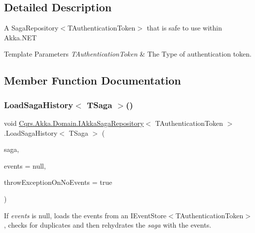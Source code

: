 \subsection{Detailed Description}
A Saga\+Repository$<$\+T\+Authentication\+Token$>$ that is safe to use within Akka.\+N\+ET 


\begin{DoxyTemplParams}{Template Parameters}
{\em T\+Authentication\+Token} & The Type of authentication token.\\
\hline
\end{DoxyTemplParams}


\subsection{Member Function Documentation}
\mbox{\label{interfaceCqrs_1_1Akka_1_1Domain_1_1IAkkaSagaRepository_a77233d8c2230c0a69a993faaac0101a9_a77233d8c2230c0a69a993faaac0101a9}} 
\subsubsection{\texorpdfstring{Load\+Saga\+History$<$ T\+Saga $>$()}{LoadSagaHistory< TSaga >()}}
{\footnotesize\ttfamily void \hyperlink{interfaceCqrs_1_1Akka_1_1Domain_1_1IAkkaSagaRepository}{Cqrs.\+Akka.\+Domain.\+I\+Akka\+Saga\+Repository}$<$ T\+Authentication\+Token $>$.Load\+Saga\+History$<$ T\+Saga $>$ (\begin{DoxyParamCaption}\item[{T\+Saga}]{saga,  }\item[{I\+List$<$ \hyperlink{interfaceCqrs_1_1Events_1_1ISagaEvent}{I\+Saga\+Event}$<$ T\+Authentication\+Token $>$$>$}]{events = {\ttfamily null},  }\item[{bool}]{throw\+Exception\+On\+No\+Events = {\ttfamily true} }\end{DoxyParamCaption})}



If {\itshape events}  is null, loads the events from an I\+Event\+Store$<$\+T\+Authentication\+Token$>$, checks for duplicates and then rehydrates the {\itshape saga}  with the events. 


